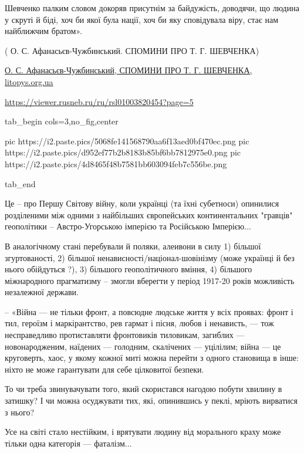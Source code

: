 \begin{itemize}
\begin{itemize}
Шевченко палким словом докоряв присутнім за байдужість, доводячи, що людина у
скруті й біді, хоч би якої була нації, хоч би яку сповідувала віру, стає нам
найближчим братом».

( О. С. Афанасьєв-Чужбинський. СПОМИНИ ПРО Т. Г. ШЕВЧЕНКА)

\href{http://litopys.org.ua/shevchenko/spog24.htm}{%
О. С. Афанасьєв-Чужбинський, СПОМИНИ ПРО Т. Г. ШЕВЧЕНКА, litopys.org.ua%
}


\url{https://viewer.rusneb.ru/ru/rsl01003820454?page=5}


\ifcmt
  tab_begin cols=3,no_fig,center

     pic https://i2.paste.pics/5068fe141568790aa6f13aed0bf470ec.png
		 pic https://i2.paste.pics/d952ef77b2b8183b85bf6bb7812975e0.png
		 pic https://i2.paste.pics/4d8465f48b7581bb603094feb7c556be.png

  tab_end
\fi


\end{itemize} %


Це – про Першу Світову війну, коли українці (та їхні субетноси) опинилися
розділеними між одними з найбільших європейських континентальних "гравців"
геополітики – Австро-Угорською імперією та Російською Імперією...

В аналогічному стані перебували й поляки, алеивони в силу 1) більшої
згуртованості, 2) більшої ненависності/націонал-шовінізму (може українці й без
нього обійдуться ?), 3) більшого геополітичного вміння, 4) більшого
міжнародного прагматизму – змогли вберегти у період 1917-20 років можливість
незалежної держави.

– «Війна — не тільки фронт, а повсюдне людське життя у всіх проявах: фронт і
тил, героїзм і маркірантство, рев гармат і пісня, любов і ненависть, — тож
несправедливо протиставляти фронтовиків тиловикам, загиблих — новонародженим,
наїдених — голодним, скалічених — уцілілим; війна — це круговерть, хаос, у
якому кожної миті можна перейти з одного становища в інше: ніхто не може
гарантувати для себе цілковитої безпеки.

То чи треба звинувачувати того, який скористався нагодою побути хвилину в
затишку? І чи можна осуджувати тих, які, опинившись у пеклі, мріють вирватися з
нього?

Усе на світі стало нестійким, і врятувати людину від морального краху може
тільки одна категорія — фаталізм...


\end{itemize}
